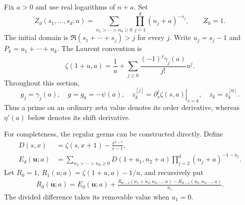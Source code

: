 \documentclass[11pt,a4paper]{article}
\numberwithin{equation}{section}
\theoremstyle{definition}
\theoremstyle{remark}
\begin{document}
Fix $a>0$ and use real logarithms of $n+a$. Set
\[
 Z_d(s_1,\ldots,s_d;a)
 =\sum_{n_1>\cdots>n_d\ge0}\prod_{j=1}^d(n_j+a)^{-s_j},
 \qquad Z_0=1.
\]
The initial domain is $\Re(s_1+\cdots+s_j)>j$ for every $j$.
Write $u_j=s_j-1$ and $P_k=u_1+\cdots+u_k$.
The Laurent convention is
\begin{equation}\label{oq:stieltjes}
 \zeta(1+u,a)=\frac1u+
 \sum_{j\ge0}\frac{(-1)^j\gamma_j(a)}{j!}u^j.
\end{equation}
Throughout this section,
\[
 g_j=\gamma_j(a),\quad g=g_0=-\psi(a),\quad
 z_k^{[j]}=\left.\partial_s^j\zeta(s,a)\right|_{s=k},
 \quad z_k=z_k^{[0]}.
\]
Thus a prime on an ordinary zeta value denotes its order derivative,
whereas $\eta'(a)$ below denotes its shift derivative.

For completeness, the regular germs can be constructed directly.
Define
\begin{align}
 D(s,x)&=\zeta(s,x+1)-\frac{x^{1-s}}{s-1},\label{oq:D}\\
 E_d(\mathbf u;a)&=
 \sum_{n_2>\cdots>n_d\ge0}
 D(1+u_1,n_2+a)\prod_{j=2}^d(n_j+a)^{-1-u_j}.
 \label{oq:E}
\end{align}
Let $R_0=1$, $R_1(u;a)=\zeta(1+u,a)-1/u$, and recursively put
\begin{align}\label{oq:Rrec}
 R_d(\mathbf u;a)=E_d(\mathbf u;a)+
 \frac{R_{d-1}(u_1+u_2,u_3,\ldots;a)
       -R_{d-1}(u_2,u_3,\ldots;a)}{u_1}.
\end{align}
The divided difference takes its removable value when $u_1=0$.
\end{document}
